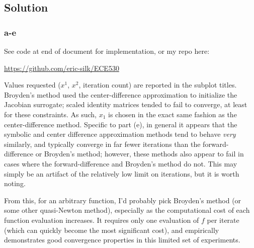 \documentclass[11pt]{report}
\theoremstyle{definition}
\begin{document}
\subsection*{Solution}
\subsubsection*{a-e}
See code at end of document for implementation, or my repo here:
\begin{center}
	\href{https://github.com/eric-silk/ECE530}{https://github.com/eric-silk/ECE530}
\end{center}

Values requested ($x^1$, $x^2$, iteration count) are reported in the subplot
titles.  Broyden's method used the center-difference approximation to initialize
the Jacobian surrogate; scaled identity matrices tended to fail to converge, at
least for these constraints. As such, $x_1$ is chosen in the exact same fashion
as the center-difference method. Specific to part (e), in general it appears
that the symbolic and center difference approximation methods tend to behave
\textit{very} similarly, and typically converge in far fewer iterations than the
forward-difference or Broyden's method; however, these methods also appear to
fail in cases where the forward-difference and Broyden's method do not. This may
simply be an artifact of the relatively low limit on iterations, but it is worth
noting.

From this, for an arbitrary function, I'd probably pick Broyden's method (or
some other quasi-Newton method), especially as the computational cost of each
function evaluation increases.  It requires only one evaluation of $f$ per
iterate (which can quickly become the most significant cost), and empirically
demonstrates good convergence properties in this limited set of experiments.
\end{document}
